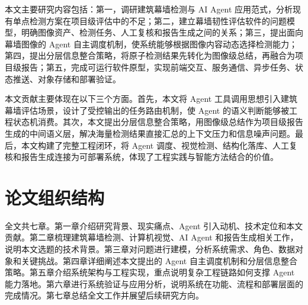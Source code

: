 本文主要研究内容包括：第一，调研建筑幕墙检测与 AI Agent 应用范式，分析现有单点检测方案在项目级评估中的不足；第二，建立幕墙韧性评估软件的问题模型，明确图像资产、检测任务、人工复核和报告生成之间的关系；第三，提出面向幕墙图像的 Agent 自主调度机制，使系统能够根据图像内容动态选择检测能力；第四，提出分层信息整合策略，将原子检测结果先转化为图像级总结，再融合为项目级报告；第五，完成可运行软件原型，实现前端交互、服务通信、异步任务、状态推送、对象存储和部署验证。

本文贡献主要体现在以下三个方面。首先，本文将 Agent 工具调用思想引入建筑幕墙评估场景，设计了受控输出的任务路由机制，使 Agent 的语义判断能够被工程状态机消费。其次，本文提出分层信息整合策略，用图像级总结作为项目级报告生成的中间语义层，解决海量检测结果直接汇总的上下文压力和信息噪声问题。最后，本文构建了完整工程闭环，将 Agent 调度、视觉检测、结构化落库、人工复核和报告生成连接为可部署系统，体现了工程实践与智能方法结合的价值。

\section{论文组织结构}
\label{sec:intro-structure}

全文共七章。第一章介绍研究背景、现实痛点、Agent 引入动机、技术定位和本文贡献。第二章梳理建筑幕墙检测、计算机视觉、AI Agent 和报告生成相关工作，说明本文选题的技术背景。第三章对问题进行建模，分析系统需求、角色、数据对象和关键挑战。第四章详细阐述本文提出的 Agent 自主调度机制和分层信息整合策略。第五章介绍系统架构与工程实现，重点说明复杂工程链路如何支撑 Agent 能力落地。第六章进行系统验证与应用分析，说明系统在功能、流程和部署层面的完成情况。第七章总结全文工作并展望后续研究方向。
